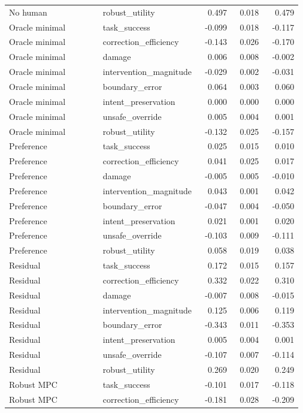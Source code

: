 \documentclass{article}
\begin{document}
\begin{center}
\begin{longtable}{p{0.32\linewidth}p{0.25\linewidth}rrr}
No human & robust\_utility & 0.497 & 0.018 & 0.479\\
Oracle minimal & task\_success & -0.099 & 0.018 & -0.117\\
Oracle minimal & correction\_efficiency & -0.143 & 0.026 & -0.170\\
Oracle minimal & damage & 0.006 & 0.008 & -0.002\\
Oracle minimal & intervention\_magnitude & -0.029 & 0.002 & -0.031\\
Oracle minimal & boundary\_error & 0.064 & 0.003 & 0.060\\
Oracle minimal & intent\_preservation & 0.000 & 0.000 & 0.000\\
Oracle minimal & unsafe\_override & 0.005 & 0.004 & 0.001\\
Oracle minimal & robust\_utility & -0.132 & 0.025 & -0.157\\
Preference & task\_success & 0.025 & 0.015 & 0.010\\
Preference & correction\_efficiency & 0.041 & 0.025 & 0.017\\
Preference & damage & -0.005 & 0.005 & -0.010\\
Preference & intervention\_magnitude & 0.043 & 0.001 & 0.042\\
Preference & boundary\_error & -0.047 & 0.004 & -0.050\\
Preference & intent\_preservation & 0.021 & 0.001 & 0.020\\
Preference & unsafe\_override & -0.103 & 0.009 & -0.111\\
Preference & robust\_utility & 0.058 & 0.019 & 0.038\\
Residual & task\_success & 0.172 & 0.015 & 0.157\\
Residual & correction\_efficiency & 0.332 & 0.022 & 0.310\\
Residual & damage & -0.007 & 0.008 & -0.015\\
Residual & intervention\_magnitude & 0.125 & 0.006 & 0.119\\
Residual & boundary\_error & -0.343 & 0.011 & -0.353\\
Residual & intent\_preservation & 0.005 & 0.004 & 0.001\\
Residual & unsafe\_override & -0.107 & 0.007 & -0.114\\
Residual & robust\_utility & 0.269 & 0.020 & 0.249\\
Robust MPC & task\_success & -0.101 & 0.017 & -0.118\\
Robust MPC & correction\_efficiency & -0.181 & 0.028 & -0.209\\

\end{longtable}
\end{center}
\end{document}
